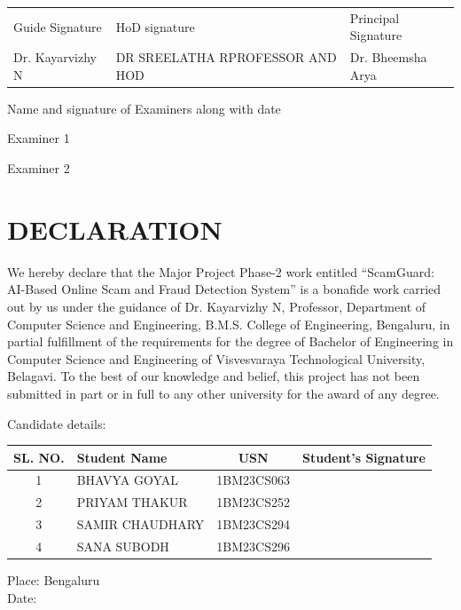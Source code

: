\vspace{1.5cm}
\noindent
\begin{tabular}{@{}p{4.6cm}p{5.0cm}p{4.6cm}@{}}
Guide Signature & HoD signature & Principal Signature\\[0.3cm]
Dr. Kayarvizhy N & DR SREELATHA R\newline PROFESSOR AND HOD & Dr. Bheemsha Arya
\end{tabular}

\vspace{1.5cm}
\noindent Name and signature of Examiners along with date

\vspace{1cm}
\noindent Examiner 1

\vspace{1cm}
\noindent Examiner 2
\clearpage

\chapter*{\centering DECLARATION}
We hereby declare that the Major Project Phase-2 work entitled ``ScamGuard: AI-Based Online Scam and Fraud Detection System'' is a bonafide work carried out by us under the guidance of Dr. Kayarvizhy N, Professor, Department of Computer Science and Engineering, B.M.S. College of Engineering, Bengaluru, in partial fulfillment of the requirements for the degree of Bachelor of Engineering in Computer Science and Engineering of Visvesvaraya Technological University, Belagavi. To the best of our knowledge and belief, this project has not been submitted in part or in full to any other university for the award of any degree.

\vspace{0.3cm}\noindent Candidate details:
\vspace{0.2cm}
\begin{center}
\begin{tabular}{|c|l|c|c|}
\hline
\textbf{SL. NO.} & \textbf{Student Name} & \textbf{USN} & \textbf{Student's Signature} \\
\hline
1 & BHAVYA GOYAL & 1BM23CS063 & \hspace{3cm} \\
\hline
2 & PRIYAM THAKUR & 1BM23CS252 & \\
\hline
3 & SAMIR CHAUDHARY & 1BM23CS294 & \\
\hline
4 & SANA SUBODH & 1BM23CS296 & \\
\hline
\end{tabular}
\end{center}
\noindent Place: Bengaluru\\
Date:

